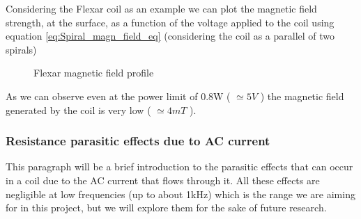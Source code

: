 Considering the Flexar coil as an example we can plot the magnetic field strength, at the surface, as a function of the voltage applied to the coil using equation \ref{eq:Spiral_magn_field_eq} (considering the coil as a parallel of two spirals)

\begin{figure}
    \centering
    \resizebox{0.5\textwidth}{!}{}
    \caption{Flexar magnetic field profile}
    \label{fig: Flexar_magnetic_field}
\end{figure}

As we can observe even at the power limit of 0.8W ( $\simeq 5V$ ) the magnetic field generated by the coil is very low ( $\simeq 4mT$ ).

\subsubsection{Resistance parasitic effects due to AC current}
This paragraph will be a brief introduction to the parasitic effects that can occur in a coil due to the AC current that flows through it. All these effects are negligible at low frequencies (up to about 1kHz) which is the range we are aiming for in this project, but we will explore them for the sake of future research.

